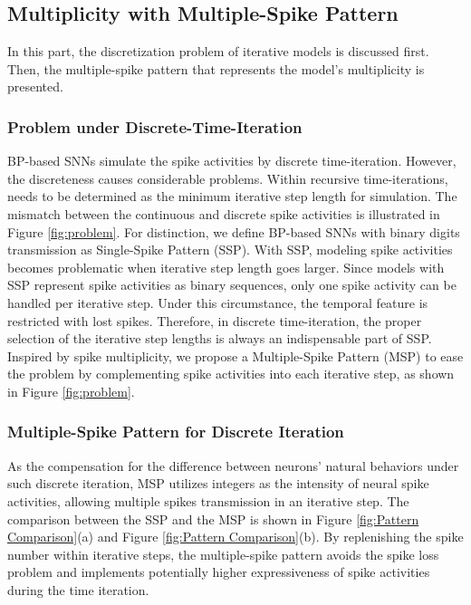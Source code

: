 \documentclass{article}
\begin{document}
\subsection{Multiplicity with Multiple-Spike Pattern}
In this part, the discretization problem of iterative models is discussed first. Then, the multiple-spike pattern that represents the model's multiplicity is presented.



\subsubsection{Problem under Discrete-Time-Iteration}
BP-based SNNs simulate the spike activities by discrete time-iteration. However, the discreteness causes considerable problems. Within recursive time-iterations,  needs to be determined as the minimum iterative step length for simulation. 
The mismatch between the continuous and discrete spike activities is illustrated in Figure \ref{fig:problem}. 
For distinction, we define BP-based SNNs with binary digits transmission as Single-Spike Pattern (SSP). With SSP, modeling spike activities becomes problematic when iterative step length  goes larger. 
Since models with SSP represent spike activities as binary sequences, only one spike activity can be handled per iterative step. Under this circumstance, the temporal feature is restricted with lost spikes. Therefore, in discrete time-iteration, the proper selection of the iterative step lengths is always an indispensable part of SSP. Inspired by spike multiplicity, 
we propose a Multiple-Spike Pattern (MSP) to ease the problem by complementing spike activities into each iterative step, as shown in Figure \ref{fig:problem}.














\subsubsection{Multiple-Spike Pattern for Discrete Iteration}







As the compensation for the difference between neurons' natural behaviors under such discrete iteration, MSP utilizes integers as the intensity of neural spike activities, allowing multiple spikes transmission in an iterative step. The comparison between the SSP and the MSP is shown in Figure \ref{fig:Pattern Comparison}(a) and Figure \ref{fig:Pattern Comparison}(b).
By replenishing the spike number within iterative steps, the multiple-spike pattern avoids the spike loss problem and implements potentially higher expressiveness of spike activities during the time iteration.
\end{document}
